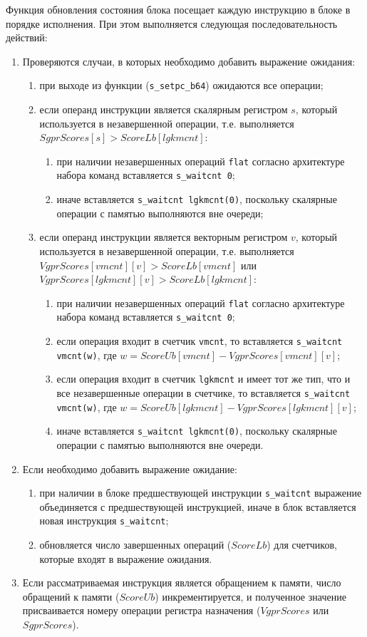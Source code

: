 \documentclass[a4paper,14pt]{extarticle}
\newenvironment{ol}{\begin{enumerate}[noitemsep,topsep=0em]}{\end{enumerate}\vspace{20pt}}
\newenvironment{inlineol}{\begin{enumerate}[noitemsep,topsep=0em]}{\end{enumerate}}
\begin{document}
Функция обновления состояния блока посещает каждую инструкцию в блоке в порядке
исполнения. При этом выполняется следующая последовательность действий:
\begin{ol}
\item Проверяются случаи, в которых необходимо добавить выражение ожидания:
  \begin{ol}
  \item при выходе из функции (\texttt{s\_setpc\_b64}) ожидаются все операции;
  \item если операнд инструкции является скалярным регистром $s$, который используется в
    незавершенной операции, т.е. выполняется $SgprScores[s] > ScoreLb[lgkmcnt]$:
    \begin{inlineol}
    \item при наличии незавершенных операций \texttt{flat} согласно архитектуре набора
      команд\cite[Глава~9.2.2]{vega-isa} вставляется \texttt{s\_waitcnt 0};
    \item иначе вставляется \texttt{s\_waitcnt lgkmcnt(0)}, поскольку скалярные операции с памятью
      выполняются вне очереди;
    \end{inlineol}
  \item если операнд инструкции является векторным регистром $v$, который используется в
    незавершенной операции, т.е. выполняется $VgprScores[vmcnt][v] > ScoreLb[vmcnt]$ или
    $VgprScores[lgkmcnt][v] > ScoreLb[lgkmcnt]$:
    \begin{inlineol}
    \item при наличии незавершенных операций \texttt{flat} согласно архитектуре набора
      команд вставляется \texttt{s\_waitcnt 0};
    \item если операция входит в счетчик \texttt{vmcnt}, то вставляется \texttt{s\_waitcnt vmcnt(w)},
      где $w = ScoreUb[vmcnt] - VgprScores[vmcnt][v]$;
    \item если операция входит в счетчик \texttt{lgkmcnt} и имеет тот же тип, что и все
      незавершенные операции в счетчике, то вставляется \texttt{s\_waitcnt vmcnt(w)},
      где $w = ScoreUb[lgkmcnt] - VgprScores[lgkmcnt][v]$;
    \item иначе вставляется \texttt{s\_waitcnt lgkmcnt(0)}, поскольку скалярные операции с памятью
      выполняются вне очереди.
    \end{inlineol}
  \end{ol}
\item Если необходимо добавить выражение ожидание:
  \begin{ol}
  \item при наличии в блоке предшествующей инструкции \texttt{s\_waitcnt} выражение объединяется
    с предшествующей инструкцией, иначе в блок вставляется новая инструкция \texttt{s\_waitcnt};
  \item обновляется число завершенных операций ($ScoreLb$) для счетчиков,
    которые входят в выражение ожидания.
  \end{ol}
\item Если рассматриваемая инструкция является обращением к памяти,
  число обращений к памяти ($ScoreUb$) инкрементируется, и полученное значение
  присваивается номеру операции регистра назначения ($VgprScores$ или $SgprScores$).
\end{ol}
\end{document}
